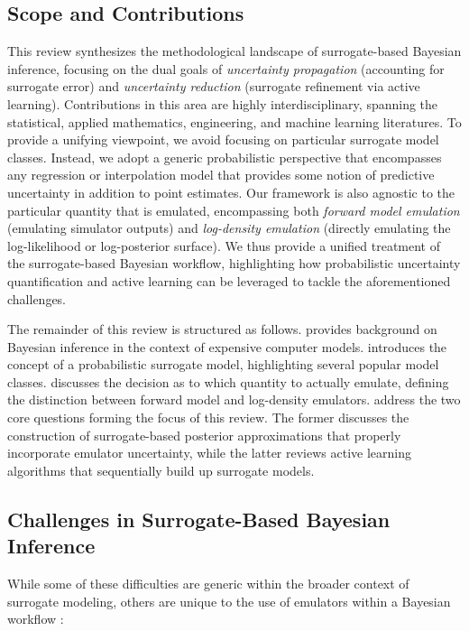 \documentclass[12pt]{article}
\begin{document}
\subsection{Scope and Contributions}
This review synthesizes the methodological landscape of surrogate-based Bayesian inference, 
focusing on the dual goals of \textit{uncertainty propagation} (accounting for surrogate error) and 
\textit{uncertainty reduction} (surrogate refinement via active learning). Contributions in this 
area are highly interdisciplinary, spanning the statistical, applied mathematics, engineering, and 
machine learning literatures. To provide a unifying viewpoint, we avoid focusing on particular 
surrogate model classes. Instead, we adopt a generic probabilistic perspective that encompasses any 
regression or interpolation model that provides some notion of predictive uncertainty in addition 
to point estimates. Our framework is also agnostic to the particular quantity that is emulated,
encompassing both \textit{forward model emulation} (emulating simulator outputs) and 
\textit{log-density emulation} (directly emulating the log-likelihood or log-posterior surface).
We thus provide a unified treatment of the surrogate-based Bayesian workflow, highlighting 
how probabilistic uncertainty quantification and active learning can be leveraged to 
tackle the aforementioned challenges.

The remainder of this review is structured as follows.  provides background 
on Bayesian inference in the context of expensive computer models. 
introduces the concept of a probabilistic surrogate model, highlighting several popular 
model classes.  discusses the decision as to which quantity to actually 
emulate, defining the distinction between forward model and log-density emulators. 
 address the two core questions forming the 
focus of this review. The former discusses the construction of surrogate-based 
posterior approximations that properly incorporate emulator uncertainty, while the latter
reviews active learning algorithms that sequentially build up surrogate models.  

\subsection{Challenges in Surrogate-Based Bayesian Inference}

While some of these difficulties are generic within the broader context of surrogate modeling,
others are unique to the use of emulators within a Bayesian workflow \citep{BurknerSurrogate}:
\end{document}
